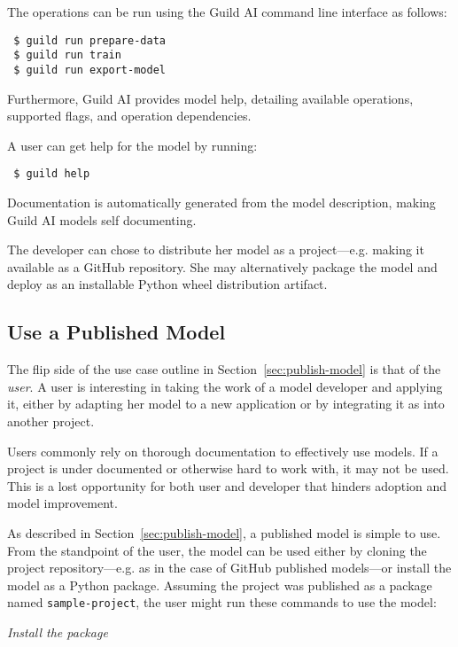 \documentclass{article}
\begin{document}
The operations can be run using the Guild AI command line interface as
follows:

{\footnotesize
\begin{verbatim}
 $ guild run prepare-data
 $ guild run train
 $ guild run export-model
\end{verbatim}}

Furthermore, Guild AI provides model help, detailing available
operations, supported flags, and operation dependencies.

A user can get help for the model by running:

{\footnotesize
\begin{verbatim}
 $ guild help
\end{verbatim}}

Documentation is automatically generated from the model description,
making Guild AI models self documenting.

The developer can chose to distribute her model as a
project---e.g. making it available as a GitHub repository. She may
alternatively package the model and deploy as an installable Python
wheel distribution artifact.

\subsection{Use a Published Model}
\label{sec:use-model}

The flip side of the use case outline in
Section~\ref{sec:publish-model} is that of the \emph{user}. A user is
interesting in taking the work of a model developer and applying it,
either by adapting her model to a new application or by integrating
it as into another project.

Users commonly rely on thorough documentation to effectively use
models. If a project is under documented or otherwise hard to work
with, it may not be used. This is a lost opportunity for both user and
developer that hinders adoption and model improvement.

As described in Section~\ref{sec:publish-model}, a published model is
simple to use. From the standpoint of the user, the model can be used
either by cloning the project repository---e.g. as in the case of
GitHub published models---or install the model as a Python
package. Assuming the project was published as a package named
\verb|sample-project|, the user might run these commands to use the
model:

\setlength{\parindent}{1em}

{\footnotesize\emph{Install the package}}
\end{document}
